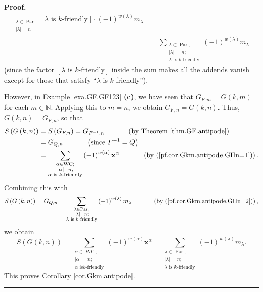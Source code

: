 \documentclass[numbers=enddot,12pt,final,onecolumn,notitlepage]{scrartcl}%
\theoremstyle{definition}
\newenvironment{proof}[1][Proof]{\noindent\textbf{#1.} }{\ \rule{0.5em}{0.5em}}
\let\sumnonlimits\sum
\renewcommand{\sum}{\sumnonlimits\limits}
\begin{document}
\begin{proof}
\begin{align}
_{\substack{\lambda\in\operatorname*{Par};\\\left\vert \lambda\right\vert
=n}}\left[  \lambda\text{ is }k\text{-friendly}\right]  \cdot\left(
-1\right)  ^{w\left(  \lambda\right)  }m_{\lambda}\nonumber\\
&  =\sum_{\substack{\lambda\in\operatorname*{Par};\\\left\vert \lambda
\right\vert =n;\\\lambda\text{ is }k\text{-friendly}}}\left(  -1\right)
^{w\left(  \lambda\right)  }m_{\lambda} \label{pf.cor.Gkm.antipode.GHn=2}%
\end{align}
(since the factor $\left[  \lambda\text{ is }k\text{-friendly}\right]  $
inside the sum makes all the addends vanish except for those that satisfy
\textquotedblleft$\lambda$ is $k$-friendly\textquotedblright).

However, in Example \ref{exa.GF.GF123} \textbf{(c)}, we have seen that
$G_{F,m}=G\left(  k,m\right)  $ for each $m\in\mathbb{N}$. Applying this to
$m=n$, we obtain $G_{F,n}=G\left(  k,n\right)  $. Thus, $G\left(  k,n\right)
=G_{F,n}$, so that%
\begin{align*}
S\left(  G\left(  k,n\right)  \right)   &  =S\left(  G_{F,n}\right)
=G_{F^{-1},n}\ \ \ \ \ \ \ \ \ \ \left(  \text{by Theorem
\ref{thm.GF.antipode}}\right) \\
&  =G_{Q,n}\ \ \ \ \ \ \ \ \ \ \left(  \text{since }F^{-1}=Q\right) \\
&  =\sum_{\substack{\alpha\in\operatorname*{WC};\\\left\vert \alpha\right\vert
=n;\\\alpha\text{ is }k\text{-friendly}}}\left(  -1\right)  ^{w\left(
\alpha\right)  }\mathbf{x}^{\alpha}\ \ \ \ \ \ \ \ \ \ \left(  \text{by
(\ref{pf.cor.Gkm.antipode.GHn=1})}\right)  .
\end{align*}
Combining this with%
\[
S\left(  G\left(  k,n\right)  \right)  =G_{Q,n}=\sum_{\substack{\lambda
\in\operatorname*{Par};\\\left\vert \lambda\right\vert =n;\\\lambda\text{ is
}k\text{-friendly}}}\left(  -1\right)  ^{w\left(  \lambda\right)  }m_{\lambda
}\ \ \ \ \ \ \ \ \ \ \left(  \text{by (\ref{pf.cor.Gkm.antipode.GHn=2}%
)}\right)  ,
\]
we obtain%
\[
S\left(  G\left(  k,n\right)  \right)  =\sum_{\substack{\alpha\in
\operatorname*{WC};\\\left\vert \alpha\right\vert =n;\\\alpha\text{ is
}k\text{-friendly}}}\left(  -1\right)  ^{w\left(  \alpha\right)  }%
\mathbf{x}^{\alpha}=\sum_{\substack{\lambda\in\operatorname*{Par};\\\left\vert
\lambda\right\vert =n;\\\lambda\text{ is }k\text{-friendly}}}\left(
-1\right)  ^{w\left(  \lambda\right)  }m_{\lambda}.
\]
This proves Corollary \ref{cor.Gkm.antipode}.
\end{proof}
\end{document}

